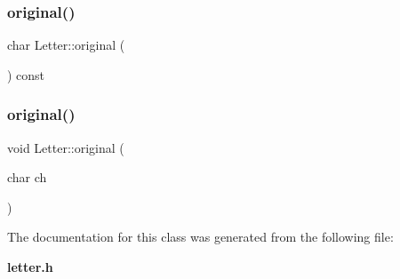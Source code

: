 \mbox{\label{class_letter_a9ae0471d69dddf53a0a64219233d0c4a}} 
\subsubsection{original()\hspace{0.1cm}{\footnotesize\ttfamily [1/2]}}
{\footnotesize\ttfamily char Letter\+::original (\begin{DoxyParamCaption}{ }\end{DoxyParamCaption}) const\hspace{0.3cm}{\ttfamily [inline]}}

\mbox{\label{class_letter_af6158c9bc58d3f4b77ee627807b87133}} 
\subsubsection{original()\hspace{0.1cm}{\footnotesize\ttfamily [2/2]}}
{\footnotesize\ttfamily void Letter\+::original (\begin{DoxyParamCaption}\item[{char}]{ch }\end{DoxyParamCaption})\hspace{0.3cm}{\ttfamily [inline]}}



The documentation for this class was generated from the following file\+:\begin{DoxyCompactItemize}
\item 
\textbf{ letter.\+h}\end{DoxyCompactItemize}
